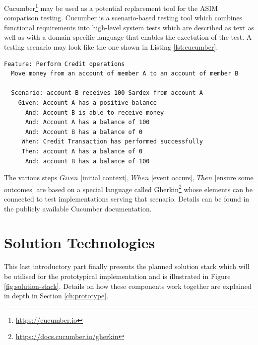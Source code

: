 Cucumber\footnote{\url{https://cucumber.io}} may be used as a potential replacement tool for the ASIM comparison testing. Cucumber is a scenario-based testing tool which combines functional requirements into high-level system tests which are described as text as well as with a domain-specific language that enables the exectution of the test. A testing scenario may look like the one shown in Listing \ref{lst:cucumber}.

\begin{center}
\begin{minipage}{0.8\textwidth}
\small
\begin{lstlisting}[language=cucumber,firstnumber=1,caption={\bf\small Cucumber test example},captionpos=b,label=lst:cucumber]
Feature: Perform Credit operations
  Move money from an account of member A to an account of member B
  
  Scenario: account B receives 100 Sardex from account A
    Given: Account A has a positive balance
      And: Account B is able to receive money
      And: Account A has a balance of 100
      And: Account B has a balance of 0
     When: Credit Transaction has performed successfully
     Then: account A has a balance of 0
      And: account B has a balance of 100
\end{lstlisting}
\end{minipage}
\end{center}

The various steps $Given$ [initial context], $When$ [event occurs], $Then$ [ensure some outcomes] are based on a special language called Gherkin\footnote{\url{https://docs.cucumber.io/gherkin}} whose elements can be connected to test implementations serving that scenario. Details can be found in the publicly available Cucumber documentation.
  
\section{Solution Technologies}
\label{sec:solution}

This last introductory part finally presents the planned solution stack which will be utilised for the prototypical implementation and is illustrated in Figure \ref{fig:solution-stack}. Details on how these components work together are explained in depth in Section \ref{ch:prototype}.

